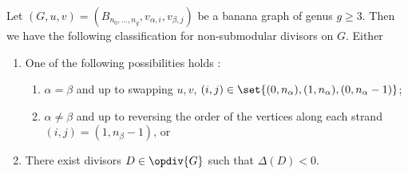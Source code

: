 \begin{theorem}\label{thm-NSMForBanana}
Let $(G,u,v) = (B_{n_0,\dots,n_g},v_{\alpha,i},v_{\beta,j})$ be a banana graph of genus $g \geq 3$. Then we have the following classification for non-submodular divisors on $G$. Either
\begin{enumerate}[label = \arabic*)]
    \item One of the following possibilities holds :
    \begin{enumerate}[label = \alph*)]
        \item $\alpha = \beta$ and up to swapping $u,v$, $(i,j) \in \set{(0,n_\alpha),(1,n_\alpha),(0,n_\alpha-1)}$;
        \item $\alpha \neq \beta$ and up to reversing the order of the vertices along each strand $(i,j) = (1,n_\beta-1)$, or
    \end{enumerate}
    \item There exist divisors $D \in \opdiv{G}$ such that $\Delta(D)<0$.
\end{enumerate}
\end{theorem}

